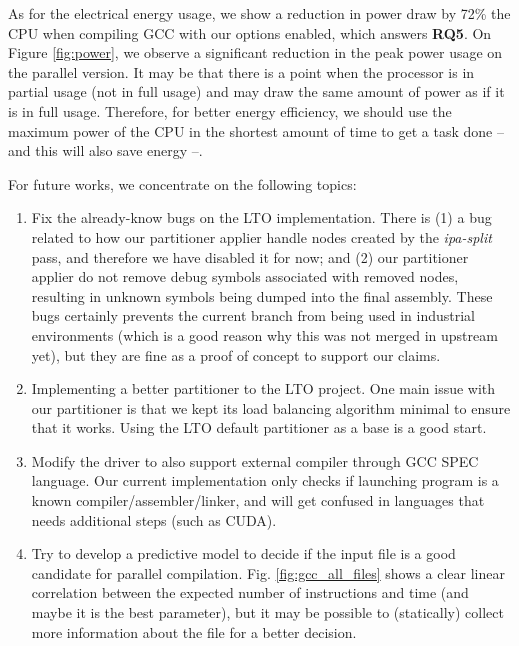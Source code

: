 As for the electrical energy usage, we show a reduction in power draw by 72\% the
CPU when compiling GCC with our options enabled, which answers \textbf{RQ5}. On
Figure \ref{fig:power}, we observe a significant reduction in the peak power
usage on the parallel version. It may be that there is a point when the
processor is in partial usage (not in full usage) and may draw the same amount
of power as if it is in full usage. Therefore, for better energy efficiency, we
should use the maximum power of the CPU in the shortest amount of time to get a
task done -- and this will also save energy --.

For future works, we concentrate on the following topics:

\begin{enumerate}

\item Fix the already-know bugs on the LTO implementation. There is (1) a bug related
to how our partitioner applier handle nodes created by the \textit{ipa-split}
pass, and therefore we have disabled it for now; and (2) our partitioner
applier do not remove debug symbols associated with removed nodes, resulting in
unknown symbols being dumped into the final assembly. These bugs certainly prevents the
current branch from being used in industrial environments (which is a good
reason why this was not merged in upstream yet), but they are fine as a proof
of concept to support our claims.

\item Implementing a better partitioner to the LTO project. One main issue
with our partitioner is that we kept its load balancing algorithm minimal to
ensure that it works. Using the LTO default partitioner as a base is a good start.

\item Modify the driver to also support external compiler through GCC
SPEC language. Our current implementation only checks if launching program
is a known compiler/assembler/linker, and will get confused in languages that
needs additional steps (such as CUDA).

\item Try to develop a predictive model to decide if the input file is
a good candidate for parallel compilation. Fig. \ref{fig:gcc_all_files} shows
a clear linear correlation between the expected number of instructions and time
(and maybe it is the best parameter), but it may be possible to (statically)
collect more information about the file for a better decision.


\end{enumerate}
